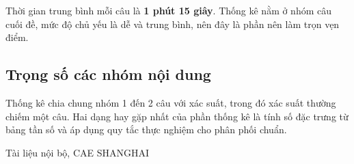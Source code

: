 \documentclass[11pt, a4paper]{article}
\begin{document}
Thời gian trung bình mỗi câu là \textbf{1 phút 15 giây}. Thống kê nằm ở nhóm câu cuối đề, mức độ chủ yếu là dễ và trung bình, nên đây là phần nên làm trọn vẹn điểm.

\subsection{Trọng số các nhóm nội dung}


Thống kê chia chung nhóm 1 đến 2 câu với xác suất, trong đó xác suất thường chiếm một câu. Hai dạng hay gặp nhất của phần thống kê là tính số đặc trưng từ bảng tần số và áp dụng quy tắc thực nghiệm cho phân phối chuẩn.
\vspace{0.8cm}
\begin{center}
{\footnotesize\color{cae_blue} Tài liệu nội bộ, CAE SHANGHAI}
\end{center}
\end{document}
